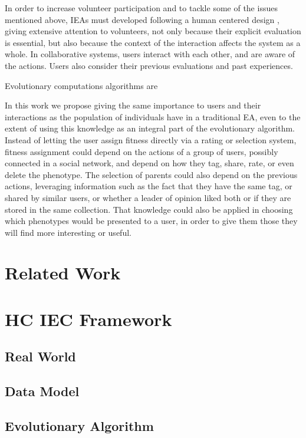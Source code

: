 In order to increase volunteer participation and to tackle some of the issues mentioned above,  
IEAs must developed following a human centered design \cite{greenhouse2012human},
giving extensive attention to volunteers, not only because their
explicit evaluation is essential, but also because the context of the 
interaction affects the system as a whole. In collaborative systems, users interact 
with each other, and are aware of the actions. Users also consider their previous evaluations
and past experiences.

Evolutionary computations algorithms are 


In this work we propose giving the same
importance to users and their interactions as the population of 
individuals have in a traditional EA, even to the extent of using this
knowledge as an integral part of the evolutionary algorithm.
Instead of letting the user assign fitness directly via a rating
or selection system, fitness assignment could depend on the actions of
a group of users, possibly connected in a social network, and depend on how 
they tag, share, rate, or even delete the phenotype. The selection of parents could
also depend on the previous actions, leveraging information such as the fact that  they have the same tag, or shared by
similar users, or whether a leader of opinion liked both or if they are stored in the same collection.
That knowledge could also be applied in choosing which phenotypes would be presented to a
user, in order to give them those they will find more interesting or useful. 




\section{Related Work}

\section{HC  IEC Framework}
  \subsection{Real World}
  \subsection{Data Model}
  \subsection{Evolutionary Algorithm}

